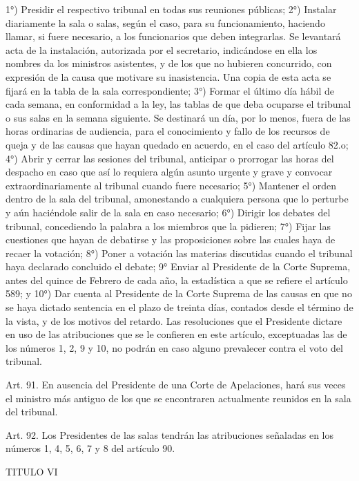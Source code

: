     1°) Presidir el respectivo tribunal en todas sus reuniones públicas;
    2°) Instalar diariamente la sala o salas, según el caso, para su funcionamiento, haciendo llamar, si fuere necesario, a los funcionarios que deben integrarlas. Se levantará acta de la instalación, autorizada por el secretario, indicándose en ella los nombres da los ministros asistentes, y de los que no hubieren concurrido, con expresión de la causa que motivare su inasistencia. Una copia de esta acta se fijará en la tabla de la sala correspondiente;
    3°) Formar el último día hábil de cada semana, en conformidad a la ley, las tablas de que deba ocuparse el tribunal o sus salas en la semana siguiente. Se destinará un día, por lo menos, fuera de las horas ordinarias de audiencia, para el conocimiento y fallo de los recursos de queja y de las causas que hayan quedado en acuerdo, en el caso del artículo 82.o;
    4°) Abrir y cerrar las sesiones del tribunal, anticipar o prorrogar las horas del despacho en caso que así lo requiera algún asunto urgente y grave y convocar extraordinariamente al tribunal cuando fuere necesario;
    5°) Mantener el orden dentro de la sala del tribunal, amonestando a cualquiera persona que lo perturbe y aún haciéndole salir de la sala en caso necesario;
    6°) Dirigir los debates del tribunal, concediendo la palabra a los miembros que la pidieren;
    7°) Fijar las cuestiones que hayan de debatirse y las proposiciones sobre las cuales haya de recaer la votación;
    8°) Poner a votación las materias discutidas cuando el tribunal haya declarado concluido el debate;
    9° Enviar al Presidente de la Corte Suprema, antes del quince de Febrero de cada año, la estadística a que se refiere el artículo 589; y
    10°) Dar cuenta al Presidente de la Corte Suprema de las causas en que no se haya dictado sentencia en el plazo de treinta días, contados desde el término de la vista, y de los motivos del retardo.
    Las resoluciones que el Presidente dictare en uso de las atribuciones que se le confieren en este artículo, exceptuadas las de los números 1, 2, 9 y 10, no podrán en caso alguno prevalecer contra el voto del tribunal.


    Art. 91. En ausencia del Presidente de una Corte de Apelaciones, hará sus veces el ministro más antiguo de los que se encontraren actualmente reunidos en la sala del tribunal.


    Art. 92. Los Presidentes de las salas tendrán las atribuciones señaladas en los números 1, 4, 5, 6, 7 y 8 del artículo 90.

    TITULO VI

